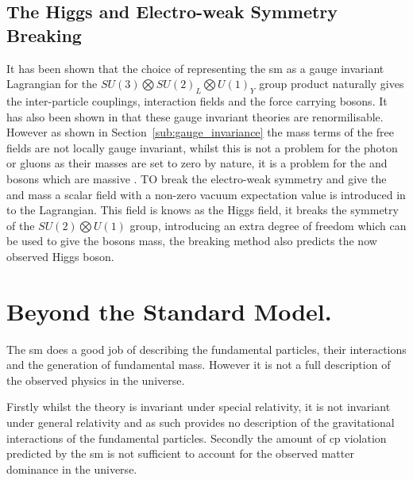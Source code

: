 \subsection{The Higgs and Electro-weak Symmetry Breaking} %
\label{sub:the_higgs_and_electro_weak_symmetry_breaking}
It has been shown that the choice of representing the \ac{sm} as a gauge 
invariant Lagrangian for the $SU(3)\bigotimes SU(2)_{L} \bigotimes U(1)_{Y}$ 
group product naturally gives the inter-particle couplings, interaction fields 
and the force carrying bosons. It has also been shown in \cite{Hooft1971167} 
that these gauge invariant theories are renormilisable. However as shown in 
Section~\ref{sub:gauge_invariance} the mass terms of the free fields are not 
locally gauge invariant, whilst this is not a problem for the photon or gluons 
as their masses are set to zero by nature, it is a problem for the \PW and \PZ 
bosons which are massive \cite{Arnison1983103,Aarnio1989539}. TO break the 
electro-weak symmetry and give the \PW and \PZ mass a scalar field with a 
non-zero vacuum expectation value is introduced in to the 
Lagrangian\cite{Higgs:1966cl,Higgs:1964eu}. This field is knows as the Higgs 
field, it breaks the symmetry of the $SU(2)\bigotimes U(1)$ group, introducing 
an extra degree of freedom which can be used to give the bosons mass, the 
breaking method also predicts the now observed\cite{Chatrchyan201230,Aad20121} 
Higgs boson.



\section{Beyond the Standard Model.} %
\label{sec:beyond_the_standard_mode_}
The \ac{sm} does a good job of describing the fundamental particles, their 
interactions and the generation of fundamental mass. However it is not a full 
description of the observed physics in the universe.

Firstly whilst the theory is invariant under special relativity, it is not 
invariant under general relativity and as such provides no description of the 
gravitational interactions of the fundamental particles. 
Secondly the amount of \ac{cp} violation predicted by the \ac{sm} is not 
sufficient to account for the observed matter dominance in the universe.

